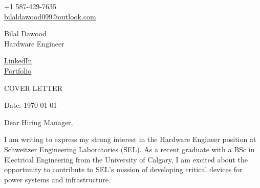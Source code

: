 \documentclass[11pt,a4]{article}
\begin{document}
\begin{center}
    \begin{minipage}[b]{0.24\textwidth}
            \large +1 587-429-7635 \\
            \large \href{mailto:bilaldawood099@outlook.com}{\underline{bilaldawood099@outlook.com}} 
    \end{minipage}%
    \begin{minipage}[b]{0.5\textwidth}
            \centering
            {\Huge Bilal Dawood} \\ %
            \vspace{0.1cm}
            {\color{UI_blue} \Large{Hardware Engineer}} \\
    \end{minipage}%
    \begin{minipage}[b]{0.24\textwidth}
            \flushright \large
            {\href{https://linkedin.com/in/bilal-dawood-2021}{\underline{LinkedIn}} } \\
            \href{https://bilaldawood01.github.io}{\underline{Portfolio}}
    \end{minipage}   
    
\vspace{-0.15cm} 
{\color{UI_blue} \hrulefill}
\end{center}

\justify
\setlength{\parindent}{0pt}
\setlength{\parskip}{12pt}
\vspace{0.2cm}
\begin{center}
    {\color{UI_blue} \Large{COVER LETTER}}
\end{center}



Date: \today \par \vspace{-0.1cm}
Dear Hiring Manager,

I am writing to express my strong interest in the Hardware Engineer position at Schweitzer Engineering Laboratories (SEL). As a recent graduate with a BSc in Electrical Engineering from the University of Calgary, I am excited about the opportunity to contribute to SEL's mission of developing critical devices for power systems and infrastructure.
\end{document}
